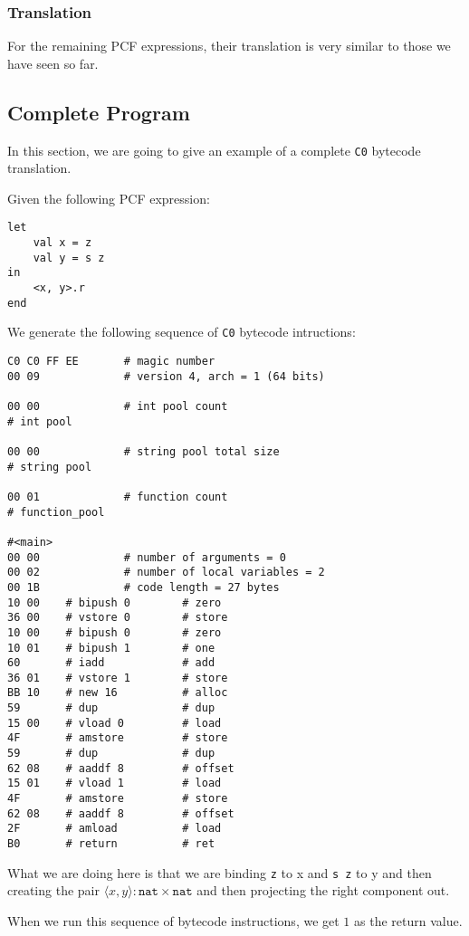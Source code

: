 \documentclass{acm_proc_article-sp}
\newcommand{\ccb}{\texttt{C0} bytecode }
\newcommand{\m}[1]{\texttt{#1}}
\begin{document}
\subsubsection{Translation}
For the remaining PCF expressions, their translation is very similar to those we have seen so far.

\subsection{Complete Program}
In this section, we are going to give an example of a complete \ccb translation.

Given the following PCF expression:

\begin{verbatim}
let
    val x = z
    val y = s z
in
    <x, y>.r
end
\end{verbatim}

We generate the following sequence of \ccb intructions:

\begin{verbatim}
C0 C0 FF EE       # magic number
00 09             # version 4, arch = 1 (64 bits)

00 00             # int pool count
# int pool

00 00             # string pool total size
# string pool

00 01             # function count
# function_pool

#<main>
00 00             # number of arguments = 0
00 02             # number of local variables = 2
00 1B             # code length = 27 bytes
10 00    # bipush 0        # zero
36 00    # vstore 0        # store
10 00    # bipush 0        # zero
10 01    # bipush 1        # one
60       # iadd            # add
36 01    # vstore 1        # store
BB 10    # new 16          # alloc
59       # dup             # dup
15 00    # vload 0         # load
4F       # amstore         # store
59       # dup             # dup
62 08    # aaddf 8         # offset
15 01    # vload 1         # load
4F       # amstore         # store
62 08    # aaddf 8         # offset
2F       # amload          # load
B0       # return          # ret
\end{verbatim}

What we are doing here is that we are binding \m{z} to x and \m{s z} to y and then creating the pair $\langle x, y\rangle : \m{nat} \times \m{nat}$ and then projecting the right component out.

When we run this sequence of bytecode instructions, we get $1$ as the return value.
\end{document}
